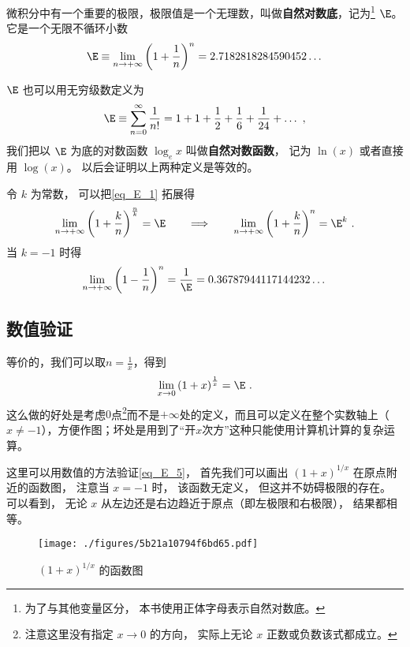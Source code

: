 
微积分中有一个重要的极限，极限值是一个无理数，叫做\textbf{自然对数底}，记为\footnote{为了与其他变量区分， 本书使用正体字母表示自然对数底。} $\E$。 它是一个无限不循环小数
\begin{equation}\label{eq_E_1}
\E \equiv \lim_{n \to +\infty} \left(1 + \frac{1}{n}\right)^n = 2.7182818284590452\dots
\end{equation}

$\E$ 也可以用无穷级数定义为
\begin{equation}\label{eq_E_2}
\E \equiv \sum_{n=0}^\infty \frac{1}{n!} = 1 + 1 + \frac{1}{2} + \frac{1}{6} + \frac{1}{24} +\dots~,
\end{equation}
我们把以 $\E$ 为底的对数函数 $\log_e x$ 叫做\textbf{自然对数函数}， 记为 $\ln(x)$ 或者直接用 $\log(x)$。 以后会证明以上两种定义是等效的。

令 $k$ 为常数， 可以把\autoref{eq_E_1} 拓展得
\begin{equation}\label{eq_E_4}
\lim_{n \to +\infty} \left(1 + \frac{k}{n}\right)^{\frac{n}{k}} = \E
\qquad \Longrightarrow\qquad
\lim_{n \to +\infty} \left(1 + \frac{k}{n}\right)^n = \E^k~.
\end{equation}
当 $k = -1$ 时得
\begin{equation}\label{eq_E_3}
\lim_{n \to +\infty} \left(1 - \frac{1}{n}\right)^n = \frac{1}{\E} = 0.36787944117144232\dots
\end{equation}

\subsection{数值验证}
等价的，我们可以取$n = \frac{1}{x}$，得到
\begin{equation}\label{eq_E_5}
\lim_{x \to 0} \left(1 + x\right)^{\frac{1}{x}} = \E~.
\end{equation}
这么做的好处是考虑$0$点\footnote{注意这里没有指定 $x\to 0$ 的方向， 实际上无论 $x$ 正数或负数该式都成立。}而不是$+\infty$处的定义，而且可以定义在整个实数轴上（$x \neq -1$），方便作图；坏处是用到了“开$x$次方”这种只能使用计算机计算的复杂运算。

这里可以用数值的方法验证\autoref{eq_E_5}， 首先我们可以画出 $(1+x)^{1/x}$ 在原点附近的函数图， 注意当 $x = -1$ 时， 该函数无定义， 但这并不妨碍极限的存在。 可以看到， 无论 $x$ 从左边还是右边趋近于原点（即左极限和右极限）， 结果都相等。
\begin{figure}[ht]
\centering
\texttt{[image: ./figures/5b21a10794f6bd65.pdf]}
\caption{$(1+x)^{1/x}$ 的函数图} \label{fig_E_1}
\end{figure}

